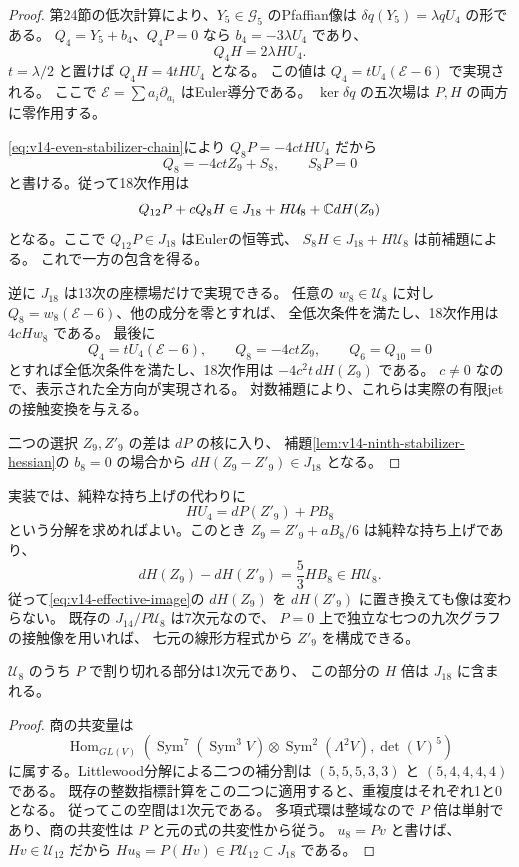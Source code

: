 \begin{proof}
第24節の低次計算により、$Y_5\in\mathcal G_5$ のPfaffian像は
$\delta q(Y_5)=\lambda qU_4$ の形である。
$Q_4=Y_5+b_4$、$Q_4P=0$ なら $b_4=-3\lambda U_4$ であり、
\[
 Q_4H=2\lambda HU_4.
\]
$t=\lambda/2$ と置けば $Q_4H=4tHU_4$ となる。
この値は $Q_4=tU_4(\mathcal E-6)$ で実現される。
ここで $\mathcal E=\sum a_i\partial_{a_i}$ はEuler導分である。
$\ker\delta q$ の五次場は $P,H$ の両方に零作用する。

\eqref{eq:v14-even-stabilizer-chain}により
$Q_8P=-4ctHU_4$ だから
\[
 Q_8=-4ctZ_9+S_8,\qquad S_8P=0
\]
と書ける。従って18次作用は
\[
 Q_{12}P+cQ_8H
 \in J_{18}+H\mathcal U_8+\mathbb C dH(Z_9)
\]
となる。ここで $Q_{12}P\in J_{18}$ はEulerの恒等式、
$S_8H\in J_{18}+H\mathcal U_8$ は前補題による。
これで一方の包含を得る。

逆に $J_{18}$ は13次の座標場だけで実現できる。
任意の $w_8\in\mathcal U_8$ に対し
$Q_8=w_8(\mathcal E-6)$、他の成分を零とすれば、
全低次条件を満たし、18次作用は $4cHw_8$ である。
最後に
\[
 Q_4=tU_4(\mathcal E-6),\qquad Q_8=-4ctZ_9,
 \qquad Q_6=Q_{10}=0
\]
とすれば全低次条件を満たし、18次作用は $-4c^2t\,dH(Z_9)$ である。
$c\ne0$ なので、表示された全方向が実現される。
対数補題により、これらは実際の有限jetの接触変換を与える。

二つの選択 $Z_9,Z'_9$ の差は $dP$ の核に入り、
補題\ref{lem:v14-ninth-stabilizer-hessian}の $b_8=0$ の場合から
$dH(Z_9-Z'_9)\in J_{18}$ となる。
\end{proof}

\begin{remark}[グラフによる計算に適した持ち上げ]
実装では、純粋な持ち上げの代わりに
\[
 HU_4=dP(Z'_9)+PB_8
\]
という分解を求めればよい。このとき
$Z_9=Z'_9+aB_8/6$ は純粋な持ち上げであり、
\[
 dH(Z_9)-dH(Z'_9)=\frac53HB_8\in H\mathcal U_8.
\]
従って\eqref{eq:v14-effective-image}の $dH(Z_9)$ を
$dH(Z'_9)$ に置き換えても像は変わらない。
既存の $J_{14}/P\mathcal U_8$ は7次元なので、
$P=0$ 上で独立な七つの九次グラフの接触像を用いれば、
七元の線形方程式から $Z'_9$ を構成できる。
\end{remark}

\begin{proposition}
\label{prop:v14-pdivisible-eighth-unit}
$\mathcal U_8$ のうち $P$ で割り切れる部分は1次元であり、
この部分の $H$ 倍は $J_{18}$ に含まれる。
\end{proposition}

\begin{proof}
商の共変量は
\[
 \operatorname{Hom}_{GL(V)}\left(
 \operatorname{Sym}^7(\operatorname{Sym}^3V)
 \otimes\operatorname{Sym}^2(\Lambda^2V),\det(V)^5\right)
\]
に属する。Littlewood分解による二つの補分割は
$(5,5,5,3,3)$ と $(5,4,4,4,4)$ である。
既存の整数指標計算をこの二つに適用すると、重複度はそれぞれ1と0となる。
従ってこの空間は1次元である。
多項式環は整域なので $P$ 倍は単射であり、商の共変性は
$P$ と元の式の共変性から従う。
$u_8=Pv$ と書けば、$Hv\in\mathcal U_{12}$ だから
$Hu_8=P(Hv)\in P\mathcal U_{12}\subset J_{18}$ である。
\end{proof}

